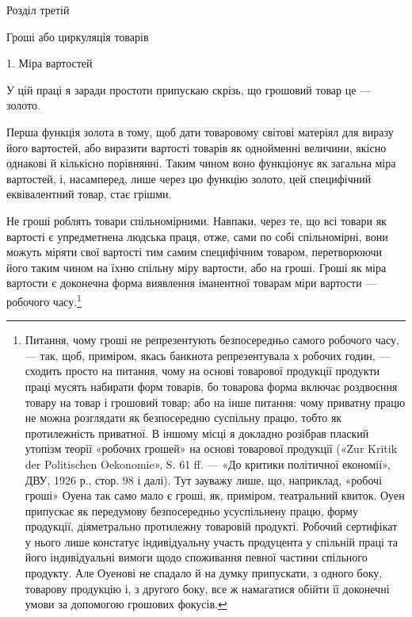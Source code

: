 Розділ третій

Гроші або циркуляція товарів

1. Міра вартостей

У цій праці я заради простоти припускаю скрізь, що грошовий
товар це — золото.

Перша функція золота в тому, щоб дати товаровому світові
матеріял для виразу його вартостей, або виразити вартості товарів
як однойменні величини, якісно однакові й кількісно порівнянні.
Таким чином воно функціонує як загальна міра вартостей,
і, насамперед, лише через цю функцію золото, цей специфічний
еквівалентний товар, стає грішми.

Не гроші роблять товари спільномірними. Навпаки, через
те, що всі товари як вартості є упредметнена людська праця, отже,
сами по собі спільномірні, вони можуть міряти свої вартості
тим самим специфічним товаром, перетворюючи його таким чином
на їхню спільну міру вартости, або на гроші. Гроші як міра
вартости є доконечна форма виявлення іманентної товарам міри
вартости — робочого часу.\footnote{
Питання, чому гроші не репрезентують безпосередньо самого робочого
часу, — так, щоб, приміром, якась банкнота репрезентувала х робочих
годин, — сходить просто на питання, чому на основі товарової продукції
продукти праці мусять набирати форм товарів, бо товарова форма
включає роздвоєння товару на товар і грошовий товар; або на інше питання:
чому приватну працю не можна розглядати як безпосередню суспільну
працю, тобто як протилежність приватної. В іншому місці я докладно
розібрав плаский утопізм теорії «робочих грошей» на основі товарової
продукції («Zur Kritik der Politischen Oekonomie», S. 61 ff. — «До критики
політичної економії», ДВУ, 1926 р., стор. 98 і далі). Тут зауважу лише,
що, наприклад, «робочі гроші» Оуена так само мало є гроші, як, приміром,
театральний квиток. Оуен припускає як передумову безпосередньо
усуспільнену працю, форму продукції, діяметрально протилежну товаровій
продукті. Робочий сертифікат у нього лише констатує індивідуальну
участь продуцента у спільній праці та його індивідуальні вимоги щодо споживання
певної частини спільного продукту. Але Оуенові не спадало й на
думку припускати, з одного боку, товарову продукцію і, з другого боку, все ж
намагатися обійти її доконечні умови за допомогою грошових фокусів.
}


